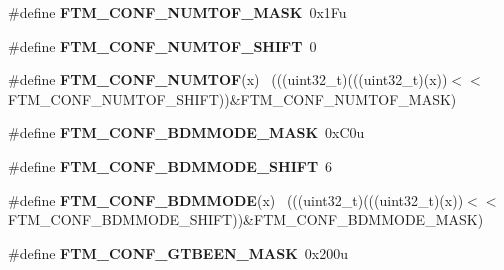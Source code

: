 \begin{DoxyCompactItemize}
\item 
\hypertarget{group___f_t_m___register___masks_gae8e95c8cac97f0cf6cec2edd277aaca3}{}\#define {\bfseries F\+T\+M\+\_\+\+C\+O\+N\+F\+\_\+\+N\+U\+M\+T\+O\+F\+\_\+\+M\+A\+S\+K}~0x1\+Fu\label{group___f_t_m___register___masks_gae8e95c8cac97f0cf6cec2edd277aaca3}

\item 
\hypertarget{group___f_t_m___register___masks_ga6ee8ba517c1d833d785fbe2fb0344726}{}\#define {\bfseries F\+T\+M\+\_\+\+C\+O\+N\+F\+\_\+\+N\+U\+M\+T\+O\+F\+\_\+\+S\+H\+I\+F\+T}~0\label{group___f_t_m___register___masks_ga6ee8ba517c1d833d785fbe2fb0344726}

\item 
\hypertarget{group___f_t_m___register___masks_gad5e522cc5e26b1e64c9cc1a12f55859f}{}\#define {\bfseries F\+T\+M\+\_\+\+C\+O\+N\+F\+\_\+\+N\+U\+M\+T\+O\+F}(x)                                          ~(((uint32\+\_\+t)(((uint32\+\_\+t)(x))$<$$<$F\+T\+M\+\_\+\+C\+O\+N\+F\+\_\+\+N\+U\+M\+T\+O\+F\+\_\+\+S\+H\+I\+F\+T))\&F\+T\+M\+\_\+\+C\+O\+N\+F\+\_\+\+N\+U\+M\+T\+O\+F\+\_\+\+M\+A\+S\+K)\label{group___f_t_m___register___masks_gad5e522cc5e26b1e64c9cc1a12f55859f}

\item 
\hypertarget{group___f_t_m___register___masks_ga832712efda712d40d626989b691a0647}{}\#define {\bfseries F\+T\+M\+\_\+\+C\+O\+N\+F\+\_\+\+B\+D\+M\+M\+O\+D\+E\+\_\+\+M\+A\+S\+K}~0x\+C0u\label{group___f_t_m___register___masks_ga832712efda712d40d626989b691a0647}

\item 
\hypertarget{group___f_t_m___register___masks_gacb37f407e308d688a6bcb6a50d67730f}{}\#define {\bfseries F\+T\+M\+\_\+\+C\+O\+N\+F\+\_\+\+B\+D\+M\+M\+O\+D\+E\+\_\+\+S\+H\+I\+F\+T}~6\label{group___f_t_m___register___masks_gacb37f407e308d688a6bcb6a50d67730f}

\item 
\hypertarget{group___f_t_m___register___masks_gadf4c032546c266702a6869971234a2a5}{}\#define {\bfseries F\+T\+M\+\_\+\+C\+O\+N\+F\+\_\+\+B\+D\+M\+M\+O\+D\+E}(x)                                        ~(((uint32\+\_\+t)(((uint32\+\_\+t)(x))$<$$<$F\+T\+M\+\_\+\+C\+O\+N\+F\+\_\+\+B\+D\+M\+M\+O\+D\+E\+\_\+\+S\+H\+I\+F\+T))\&F\+T\+M\+\_\+\+C\+O\+N\+F\+\_\+\+B\+D\+M\+M\+O\+D\+E\+\_\+\+M\+A\+S\+K)\label{group___f_t_m___register___masks_gadf4c032546c266702a6869971234a2a5}

\item 
\hypertarget{group___f_t_m___register___masks_ga2ab518e33ed4bcb533a022f469c62994}{}\#define {\bfseries F\+T\+M\+\_\+\+C\+O\+N\+F\+\_\+\+G\+T\+B\+E\+E\+N\+\_\+\+M\+A\+S\+K}~0x200u\label{group___f_t_m___register___masks_ga2ab518e33ed4bcb533a022f469c62994}


\end{DoxyCompactItemize}
